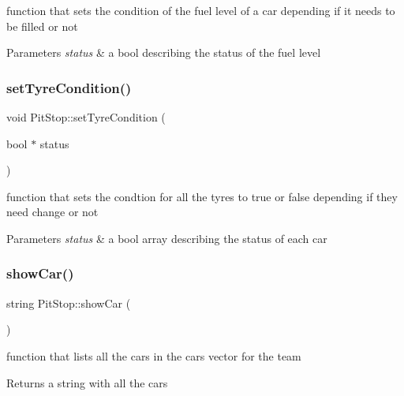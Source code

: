 function that sets the condition of the fuel level of a car depending if it needs to be filled or not 
\begin{DoxyParams}{Parameters}
{\em status} & a bool describing the status of the fuel level \\
\hline
\end{DoxyParams}
\mbox{\label{class_pit_stop_aae1894edaab6ccc3ca1d5ea18473bc47}} 
\subsubsection{\texorpdfstring{set\+Tyre\+Condition()}{setTyreCondition()}}
{\footnotesize\ttfamily void Pit\+Stop\+::set\+Tyre\+Condition (\begin{DoxyParamCaption}\item[{bool $\ast$}]{status }\end{DoxyParamCaption})}

function that sets the condtion for all the tyres to true or false depending if they need change or not 
\begin{DoxyParams}{Parameters}
{\em status} & a bool array describing the status of each car \\
\hline
\end{DoxyParams}
\mbox{\label{class_pit_stop_a50c9b32c4422d643fd8fdb901bad617a}} 
\subsubsection{\texorpdfstring{show\+Car()}{showCar()}}
{\footnotesize\ttfamily string Pit\+Stop\+::show\+Car (\begin{DoxyParamCaption}{ }\end{DoxyParamCaption})}

function that lists all the cars in the cars vector for the team \begin{DoxyReturn}{Returns}
a string with all the cars 
\end{DoxyReturn}
\mbox{\label{class_pit_stop_ad7f59968f9f74c427597bc4f80137f8b}} 
